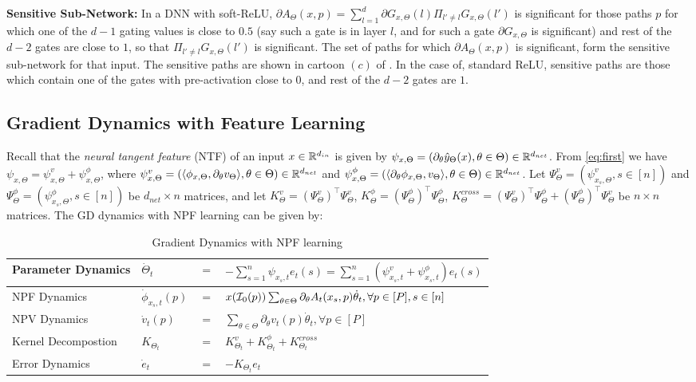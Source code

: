 \textbf{Sensitive Sub-Network:} In a DNN with soft-ReLU, $\partial A_{\Theta}(x,p)=\sum_{l=1}^d \partial G_{x,\Theta}(l)\Pi_{l'\neq l}G_{x,\Theta}(l')$ is significant for those paths $p$ for which one of the $d-1$ gating values is close to $0.5$ (say such a gate is in layer $l$, and for such a gate $\partial G_{x,\Theta}$ is significant) and rest of the $d-2$ gates are close to $1$, so that $\Pi_{l'\neq l}G_{x,\Theta}(l')$ is significant. The set of paths for which $\partial A_{\Theta}(x,p)$ is significant, form the sensitive sub-network for that input. The sensitive paths are shown in cartoon $(c)$ of . In the case of, standard ReLU, sensitive paths are those which contain one of the gates with pre-activation close to $0$, and rest of the $d-2$ gates are $1$.
\subsection{Gradient Dynamics with Feature Learning}
Recall that the \emph{neural tangent feature} (NTF) of an input $x\in\mathbb{R}^{d_{in}}$ is given by $\psi_{x,\Theta}=\left(\partial_{\theta}\hat{y}_{\Theta}(x),\theta\in\Theta\right)\in\mathbb{R}^{d_{net}}$. From \eqref{eq:first} we have $\psi_{x,\Theta}=\psi^v_{x,\Theta}+\psi^{\phi}_{x,\Theta}$, where $\psi^v_{x,\Theta}=\left(\langle \phi_{x,\Theta}, \partial_{\theta} v_{\Theta}\rangle,\theta\in\Theta\right)\in\mathbb{R}^{d_{net}}$ and  $\psi^{\phi}_{x,\Theta}=\left(\langle \partial_{\theta}\phi_{x,\Theta}, v_{\Theta}\rangle,\theta\in\Theta\right)\in\mathbb{R}^{d_{net}}$.  Let $\Psi^v_{\Theta}=\left(\psi^v_{x_s,\Theta},s\in[n]\right)$ and $\Psi^{\phi}_{\Theta}=\left(\psi^{\phi}_{x_s,\Theta},s\in[n]\right)$ be $d_{net}\times n$ matrices, and let $K^{v}_{\Theta}=(\Psi^{v}_{\Theta})^\top \Psi^{v}_{\Theta}$, $K^{\phi}_{\Theta}=(\Psi^{\phi}_{\Theta})^\top \Psi^{\phi}_{\Theta}$, $K^{cross}_{\Theta}=(\Psi^v_{\Theta})^\top \Psi^{\phi}_{\Theta}+(\Psi^{\phi}_{\Theta})^\top\Psi^{v}_{\Theta}$ be $n\times n$ matrices. The GD dynamics with NPF learning can be given by:
\FloatBarrier
\begin{table}[h]
\begin{tabular}{| l | lll |}\hline
Parameter Dynamics & $\dot{\Theta}_t$&$=$&$-\sum_{s=1}^n \psi_{x_s,t}e_t(s)=\sum_{s=1}^n (\psi^v_{x_s,t}+\psi^{\phi}_{x_s,t})e_t(s)$\\\hline
NPF Dynamics& $\dot{\phi}_{x_s,t}(p)$&$=$&$x(\mathcal{I}_0(p))\sum_{\theta\in\Theta}\partial_{\theta}A_t(x_s,p)\dot{\theta}_t,\forall p\in[P], s\in[n]$\\\hline
NPV Dynamics& $\dot{v}_t(p)$&$=$&$\sum_{\theta\in\Theta}\partial_{\theta}v_t(p)\dot{\theta}_t,\forall p\in[P]$\\\hline
Kernel Decompostion& $K_{\Theta_t}$&$=$&$K^v_{\Theta_t}+K^{\phi}_{\Theta_t}+K^{cross}_{\Theta_t}$\\\hline
Error Dynamics& $\dot{e}_t$&$=$&$-K_{\Theta_t}e_t$\\\hline
\end{tabular}
\caption{Gradient Dynamics with NPF learning}
\label{tb:graddyna} 
\end{table}
